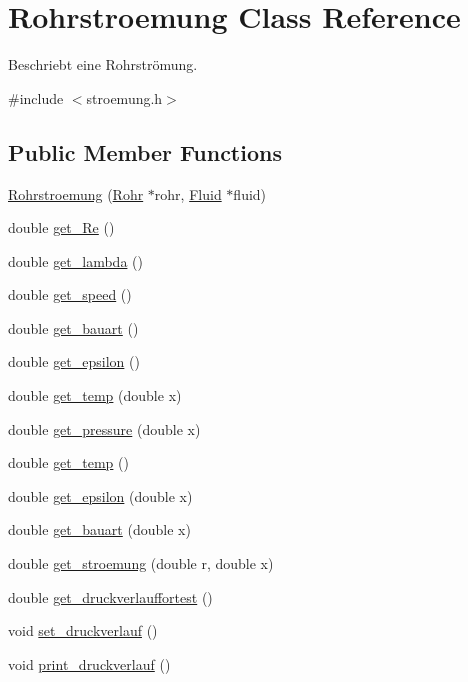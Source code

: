 \hypertarget{class_rohrstroemung}{}\section{Rohrstroemung Class Reference}
\label{class_rohrstroemung}


Beschriebt eine Rohrströmung.  




{\ttfamily \#include $<$stroemung.\+h$>$}

\subsection*{Public Member Functions}
\begin{DoxyCompactItemize}
\item 
\hyperlink{class_rohrstroemung_aa8ee146566f18b2a4ca4cbfc1946c2b8}{Rohrstroemung} (\hyperlink{class_rohr}{Rohr} $\ast$rohr, \hyperlink{class_fluid}{Fluid} $\ast$fluid)
\item 
double \hyperlink{class_rohrstroemung_aa491056aa77acac305aca0fde9c3e8bc}{get\+\_\+\+Re} ()
\item 
double \hyperlink{class_rohrstroemung_a7ea25aca94625ef68bf856d957419d26}{get\+\_\+lambda} ()
\item 
double \hyperlink{class_rohrstroemung_aa4f7d016ed9f920b8e8f0c9bdbae5213}{get\+\_\+speed} ()
\item 
double \hyperlink{class_rohrstroemung_ac4d2f31e451f1a3c97627d3a87df419d}{get\+\_\+bauart} ()
\item 
double \hyperlink{class_rohrstroemung_a47b2ddadb37169a3a21bcc914a772894}{get\+\_\+epsilon} ()
\item 
double \hyperlink{class_rohrstroemung_adc94a5748b40f9e47448a11e55809593}{get\+\_\+temp} (double x)
\item 
double \hyperlink{class_rohrstroemung_abf6265814d9ae0d148aeecb6092d8c2f}{get\+\_\+pressure} (double x)
\item 
double \hyperlink{class_rohrstroemung_a46d4e8bb41a8204b96fe0420087e69ec}{get\+\_\+temp} ()
\item 
double \hyperlink{class_rohrstroemung_ab3a28b86a6a2d630a4c37f0054fb0288}{get\+\_\+epsilon} (double x)
\item 
double \hyperlink{class_rohrstroemung_a17fccbf71ba0dc1635e3a06fdc740cf3}{get\+\_\+bauart} (double x)
\item 
double \hyperlink{class_rohrstroemung_a1eae88254e88fbb314096c795ec2fac2}{get\+\_\+stroemung} (double r, double x)
\item 
double \hyperlink{class_rohrstroemung_a1f0c06b0e89a1d8ffaf073038efdddd9}{get\+\_\+druckverlauffortest} ()
\item 
void \hyperlink{class_rohrstroemung_ade5cf2d08a2c2c23d951d54ff2d05325}{set\+\_\+druckverlauf} ()
\item 
void \hyperlink{class_rohrstroemung_a3adc6cad22e5ab2132b3d82b7368ba8e}{print\+\_\+druckverlauf} ()
\end{DoxyCompactItemize}


